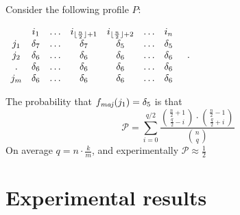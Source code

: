 	\begin{example}
		Consider the following profile $P$:
		\begin{center}
			$
			\begin{array}{ccccccc}
					& i_1 & \dots & i_{\lfloor\frac{n}{2}\rfloor + 1} & i_{\lfloor\frac{n}{2}\rfloor + 2} & \dots & i_n \\
				j_1 & \delta_7 & \dots &\delta_7 & \delta_5 & \dots & \delta_5 \\
				j_2 & \delta_6 & \dots &\delta_6 & \delta_6 & \dots & \delta_6 \\
				. & \delta_6 & \dots &\delta_6 & \delta_6 & \dots & \delta_6 \\
				j_m & \delta_6 & \dots &\delta_6 & \delta_6 & \dots & \delta_6 \\
			\end{array} \quad.
			$
		\end{center}	
		The probability that $\fmaj(j_1)=\delta_5$ is that
		\[ \mathcal{P}= \sum_{i=0}^{q/2} \frac{\binom{\frac{n}{2}+1}{ \frac{q}{2}-i}\cdot\binom{\frac{n}{2}-1}{\frac{q}{2}+i}}{\binom{n}{q}} \]
		On average $q=n\cdot\frac{k}{m}$, and experimentally $\mathcal{P}\approx \frac{1}{2}$
	\end{example}




\section{Experimental results}
	
